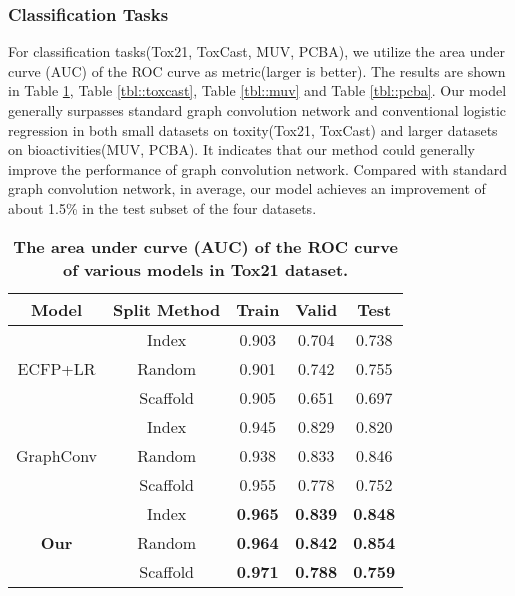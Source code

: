 \documentclass[letterpaper]{article} \usepackage{aaai18}  \usepackage{times}  \usepackage{helvet}  \usepackage{courier}  \usepackage{url}  \usepackage{graphicx}  \usepackage{amsmath}
\begin{document}
\subsubsection{Classification Tasks} For classification tasks(Tox21, ToxCast, MUV, PCBA), we utilize the area under curve (AUC) of the ROC curve as metric(larger is better). The results are shown in Table \ref{tbl::tox21}, Table \ref{tbl::toxcast}, Table \ref{tbl::muv} and Table \ref{tbl::pcba}. 
Our model generally surpasses standard graph convolution network and conventional logistic regression in both small datasets on toxity(Tox21, ToxCast) and larger datasets on bioactivities(MUV, PCBA). It indicates that our method could generally improve the performance of graph convolution network. Compared with standard graph convolution network, in average, our model achieves an improvement of about 1.5\% in the test subset of the four datasets. 




\begin{table}[!h]
\caption{\textbf{The area under curve (AUC) of the ROC curve of various models in Tox21 dataset.} }
\label{tbl::tox21}
\vskip 0.15in
\begin{center}
\begin{small}
\begin{tabular}{|c|c|c|c|c|}
\hline
Model                           & Split Method    & Train         &Valid         & Test \\
\hline
\multirow{3}{*}{ECFP+LR}        & Index      &   0.903       &   0.704      &   0.738  \\
                                & Random     &   0.901       &   0.742      &   0.755  \\
                                & Scaffold   &   0.905       &   0.651      &   0.697  \\
\hline
\multirow{3}{*}{GraphConv}      & Index      &   0.945       &   0.829      &   0.820  \\
                                & Random     &   0.938       &   0.833      &   0.846  \\
                                & Scaffold   &   0.955       &   0.778      &   0.752  \\
\hline
\multirow{3}{*}{\textbf{Our}}   & Index      &\textbf{0.965} &\textbf{0.839} &\textbf{0.848}\\
                                & Random     &\textbf{0.964} &\textbf{0.842} &\textbf{0.854}\\
                                & Scaffold   &\textbf{0.971} &\textbf{0.788} &\textbf{0.759}\\  
\hline
\end{tabular}
\end{small}
\end{center}
\vskip -0.1in
\end{table}
\end{document}
